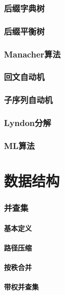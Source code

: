 \documentclass[12pt,a4paper]{article}
\begin{document}
\newpage
\section{后缀字典树}

\newpage
\section{后缀平衡树}

\newpage
\section{Manacher算法}

\newpage
\section{回文自动机} %

\newpage
\section{子序列自动机}

\newpage
\section{Lyndon分解} %

\newpage
\section{ML算法}

\newpage
\part{数据结构} %
\section{并查集}
\subsection{基本定义}
\subsection{路径压缩}
\subsection{按秩合并}
\subsection{带权并查集}
\end{document}
